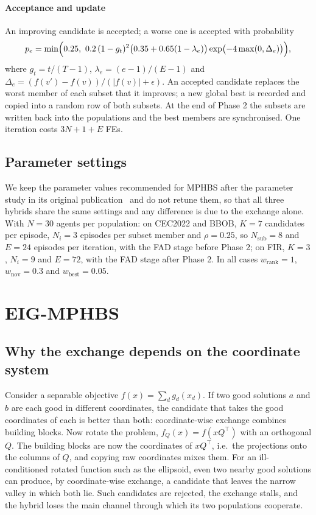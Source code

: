 \documentclass[preprint,12pt,authoryear]{elsarticle}
\theoremstyle{remark}
\begin{document}
\paragraph{Acceptance and update} An improving candidate is accepted; a worse one is accepted with probability
\begin{equation}
p_e = \min\Bigl(0.25,\ 0.2\,(1-g_t)^2\bigl(0.35+0.65(1-\lambda_e)\bigr)\exp\bigl(-4\max(0,\Delta_e)\bigr)\Bigr),
\label{eq:accept}
\end{equation}
where $g_t=t/(T-1)$, $\lambda_e=(e-1)/(E-1)$ and $\Delta_e=(f(v')-f(v))/(|f(v)|+\epsilon)$. An accepted candidate
replaces the worst member of each subset that it improves; a new global best is recorded and copied into a random row of
both subsets. At the end of Phase 2 the subsets are written back into the populations and the best members are
synchronised. One iteration costs $3N+1+E$ FEs.

\subsection{Parameter settings}
\label{sec:params}
We keep the parameter values recommended for MPHBS after the parameter study in its original
publication~\citep{flores2026mphbs} and do not retune them, so that all three hybrids share the same settings and any
difference is due to the exchange alone. With $N=30$ agents per population: on CEC2022 and BBOB, $K=7$ candidates per
episode, $N_i=3$ episodes per subset member and $\rho=0.25$, so $N_\mathrm{sub}=8$ and $E=24$ episodes per iteration,
with the FAD stage before Phase 2; on FIR, $K=3$, $N_i=9$ and $E=72$, with the FAD stage after Phase 2. In all cases
$w_\mathrm{rank}=1$, $w_\mathrm{nov}=0.3$ and $w_\mathrm{best}=0.05$.

\section{EIG-MPHBS}
\label{sec:method}

\subsection{Why the exchange depends on the coordinate system}
Consider a separable objective $f(x)=\sum_d g_d(x_d)$. If two good solutions $a$ and $b$ are each good in different
coordinates, the candidate that takes the good coordinates of each is better than both: coordinate-wise exchange
combines building blocks. Now rotate the problem, $f_Q(x)=f(xQ^\top)$ with an orthogonal $Q$. The building blocks are
now the coordinates of $xQ^\top$, i.e.\ the projections onto the columns of $Q$, and copying raw coordinates mixes them.
For an ill-conditioned rotated function such as the ellipsoid, even two nearby good solutions can produce, by
coordinate-wise exchange, a candidate that leaves the narrow valley in which both lie. Such candidates are rejected, the
exchange stalls, and the hybrid loses the main channel through which its two populations cooperate.
\end{document}
